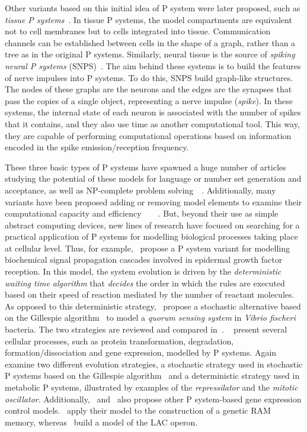 \documentclass[runningheads,a4paper]{llncs}
\begin{document}
  Other variants based on this initial idea of P system were later proposed,
  such as \emph{tissue P systems}~\cite{MartinVide2003}. In tissue P systems,
  the model compartments are equivalent not to cell membranes but to cells
  integrated into tissue. Communication channels can be established between
  cells in the shape of a graph, rather than a tree as in the original P
  systems. Similarly, neural tissue is the source of \emph{spiking neural P
    systems} (SNPS)~\cite{Ionescu2006}. The aim behind these systems is to
  build the features of nerve impulses into P systems. To do this, SNPS build
  graph-like structures. The nodes of these graphs are the neurons and the
  edges are the synapses that pass the copies of a single object, representing
  a nerve impulse (\emph{spike}). In these systems, the internal state of each
  neuron is associated with the number of spikes that it contains, and they
  also use time as another computational tool. This way, they are capable of
  performing computational operations based on information encoded in the spike
  emission/reception frequency.

  These three basic types of P systems have spawned a huge number of articles
  studying the potential of these models for language or number set generation
  and acceptance, as well as NP-complete problem
  solving~\cite{Paun2001}~\cite{Leporati2009}. Additionally, many variants have
  been proposed adding or removing model elements to examine their
  computational capacity and
  efficiency~\cite{Cavaliere2004}~\cite{Alhazov2005}~\cite{Cavaliere2008}~\cite{Cavaliere2009}.
  But, beyond their use as simple abstract computing devices, new lines of
  research have focused on searching for a practical application of P systems
  for modelling biological processes taking place at cellular level. Thus, for
  example,~\cite{Paun2006} propose a P system variant for modelling biochemical
  signal propagation cascades involved in epidermal growth factor reception. In
  this model, the system evolution is driven by the \emph{deterministic waiting
    time algorithm} that \emph{decides} the order in which the rules are
  executed based on their speed of reaction mediated by the number of reactant
  molecules. As opposed to this deterministic strategy,~\cite{Bernardini2006}
  propose a stochastic alternative based on the Gillespie
  algorithm~\cite{Gillespie1977} to model a \emph{quorum sensing system} in
  \emph{Vibrio fischeri} bacteria. The two strategies are reviewed and compared
  in~\cite{PerezJimenez2006}. ~\cite{RomCamp2007} present several cellular
  processes, such as protein transformation, degradation,
  formation/dissociation and gene expression, modelled by P systems.
  Again~\cite{Gheorghe2010} examine two different evolution strategies, a
  stochastic strategy used in stochastic P systems based on the Gillespie
  algorithm~\cite{Gillespie1977} and a deterministic strategy used in metabolic
  P systems, illustrated by examples of the \emph{repressilator} and the
  \emph{mitotic oscillator}. Additionally,~\cite{Busi2006}
  and~\cite{RomCamp2008} also propose other P system-based gene expression
  control models.~\cite{Busi2006} apply their model to the construction of a
  genetic RAM memory, whereas~\cite{RomCamp2008} build a model of the LAC
  operon.
\end{document}
